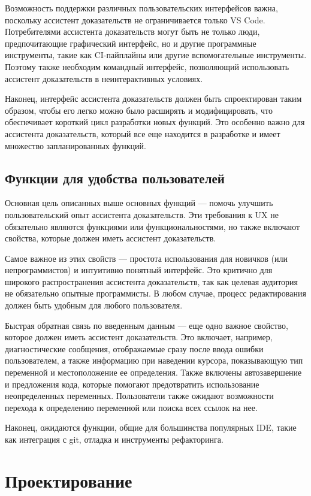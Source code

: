 Возможность поддержки различных пользовательских интерфейсов важна, поскольку ассистент доказательств не ограничивается только VS Code. Потребителями ассистента доказательств могут быть не только люди, предпочитающие графический интерфейс, но и другие программные инструменты, такие как CI-пайплайны или другие вспомогательные инструменты. Поэтому также необходим командный интерфейс, позволяющий использовать ассистент доказательств в неинтерактивных условиях.

Наконец, интерфейс ассистента доказательств должен быть спроектирован таким образом, чтобы его легко можно было расширять и модифицировать, что обеспечивает короткий цикл разработки новых функций. Это особенно важно для ассистента доказательств, который все еще находится в разработке и имеет множество запланированных функций.

\subsection{Функции для удобства пользователей}

Основная цель описанных выше основных функций — помочь улучшить пользовательский опыт ассистента доказательств. Эти требования к UX не обязательно являются функциями или функциональностями, но также включают свойства, которые должен иметь ассистент доказательств.

Самое важное из этих свойств — простота использования для новичков (или непрограммистов) и интуитивно понятный интерфейс. Это критично для широкого распространения ассистента доказательств, так как целевая аудитория не обязательно опытные программисты. В любом случае, процесс редактирования должен быть удобным для любого пользователя.

Быстрая обратная связь по введенным данным — еще одно важное свойство, которое должен иметь ассистент доказательств. Это включает, например, диагностические сообщения, отображаемые сразу после ввода ошибки пользователем, а также информацию при наведении курсора, показывающую тип переменной и местоположение ее определения. Также включены автозавершение и предложения кода, которые помогают предотвратить использование неопределенных переменных. Пользователи также ожидают возможности перехода к определению переменной или поиска всех ссылок на нее.

Наконец, ожидаются функции, общие для большинства популярных IDE, такие как интеграция с git, отладка и инструменты рефакторинга.

\section{Проектирование}

